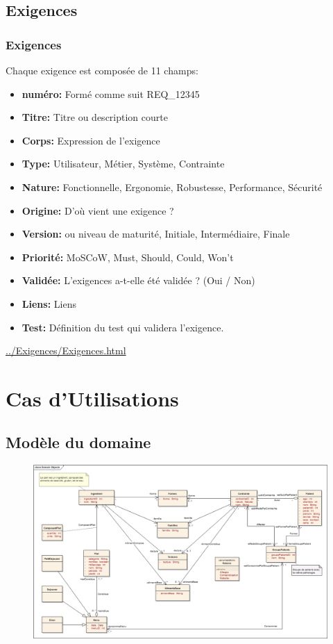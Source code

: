 \documentclass{beamer}
\begin{document}
\subsection{Exigences}
\begin{frame}
 \frametitle{Exigences}
Chaque exigence est composée de 11 champs:
\begin{itemize}
\item \textbf{numéro:} Formé comme suit REQ\_12345
\item \textbf{Titre:} Titre ou description courte
\item \textbf{Corps:} Expression de l'exigence
\item \textbf{Type:} Utilisateur, Métier, Système, Contrainte
\item \textbf{Nature:} Fonctionnelle, Ergonomie, Robustesse, Performance, Sécurité
\item \textbf{Origine:} D'où vient une exigence ?
\item \textbf{Version:} ou niveau de maturité, Initiale, Intermédiaire, Finale
\item \textbf{Priorité:} MoSCoW, Must, Should, Could, Won't
\item \textbf{Validée:} L'exigences a-t-elle été validée ? (Oui / Non)
\item \textbf{Liens:} Liens
\item \textbf{Test:} Définition du test qui validera l'exigence.
\end{itemize}

\url{../Exigences/Exigences.html}
\end{frame}

\section{Cas d'Utilisations}

\subsection{Modèle du domaine}
\begin{frame}[plain]{}
\begin{figure}
\centering
\includegraphics[scale=0.250]{../ModeleDuDomaine/ModeleDuDomaine.png}
\end{figure}
\end{frame}
\end{document}
